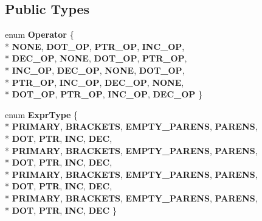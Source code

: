 \subsection*{Public Types}
\begin{DoxyCompactItemize}
\item 
enum {\bfseries Operator} \{ \\*
{\bfseries N\-O\-N\-E}, 
{\bfseries D\-O\-T\-\_\-\-O\-P}, 
{\bfseries P\-T\-R\-\_\-\-O\-P}, 
{\bfseries I\-N\-C\-\_\-\-O\-P}, 
\\*
{\bfseries D\-E\-C\-\_\-\-O\-P}, 
{\bfseries N\-O\-N\-E}, 
{\bfseries D\-O\-T\-\_\-\-O\-P}, 
{\bfseries P\-T\-R\-\_\-\-O\-P}, 
\\*
{\bfseries I\-N\-C\-\_\-\-O\-P}, 
{\bfseries D\-E\-C\-\_\-\-O\-P}, 
{\bfseries N\-O\-N\-E}, 
{\bfseries D\-O\-T\-\_\-\-O\-P}, 
\\*
{\bfseries P\-T\-R\-\_\-\-O\-P}, 
{\bfseries I\-N\-C\-\_\-\-O\-P}, 
{\bfseries D\-E\-C\-\_\-\-O\-P}, 
{\bfseries N\-O\-N\-E}, 
\\*
{\bfseries D\-O\-T\-\_\-\-O\-P}, 
{\bfseries P\-T\-R\-\_\-\-O\-P}, 
{\bfseries I\-N\-C\-\_\-\-O\-P}, 
{\bfseries D\-E\-C\-\_\-\-O\-P}
 \}
\item 
enum {\bfseries Expr\-Type} \{ \\*
{\bfseries P\-R\-I\-M\-A\-R\-Y}, 
{\bfseries B\-R\-A\-C\-K\-E\-T\-S}, 
{\bfseries E\-M\-P\-T\-Y\-\_\-\-P\-A\-R\-E\-N\-S}, 
{\bfseries P\-A\-R\-E\-N\-S}, 
\\*
{\bfseries D\-O\-T}, 
{\bfseries P\-T\-R}, 
{\bfseries I\-N\-C}, 
{\bfseries D\-E\-C}, 
\\*
{\bfseries P\-R\-I\-M\-A\-R\-Y}, 
{\bfseries B\-R\-A\-C\-K\-E\-T\-S}, 
{\bfseries E\-M\-P\-T\-Y\-\_\-\-P\-A\-R\-E\-N\-S}, 
{\bfseries P\-A\-R\-E\-N\-S}, 
\\*
{\bfseries D\-O\-T}, 
{\bfseries P\-T\-R}, 
{\bfseries I\-N\-C}, 
{\bfseries D\-E\-C}, 
\\*
{\bfseries P\-R\-I\-M\-A\-R\-Y}, 
{\bfseries B\-R\-A\-C\-K\-E\-T\-S}, 
{\bfseries E\-M\-P\-T\-Y\-\_\-\-P\-A\-R\-E\-N\-S}, 
{\bfseries P\-A\-R\-E\-N\-S}, 
\\*
{\bfseries D\-O\-T}, 
{\bfseries P\-T\-R}, 
{\bfseries I\-N\-C}, 
{\bfseries D\-E\-C}, 
\\*
{\bfseries P\-R\-I\-M\-A\-R\-Y}, 
{\bfseries B\-R\-A\-C\-K\-E\-T\-S}, 
{\bfseries E\-M\-P\-T\-Y\-\_\-\-P\-A\-R\-E\-N\-S}, 
{\bfseries P\-A\-R\-E\-N\-S}, 
\\*
{\bfseries D\-O\-T}, 
{\bfseries P\-T\-R}, 
{\bfseries I\-N\-C}, 
{\bfseries D\-E\-C}
 \}
\item 

\end{DoxyCompactItemize}

